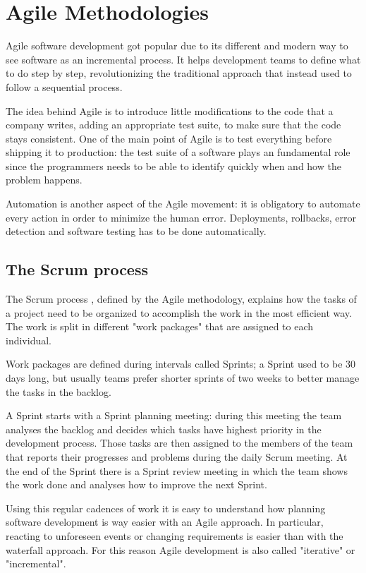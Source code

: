 \section{Agile Methodologies}

Agile software development \cite{AgileSoftwareManifesto} got popular due
to its different and modern way to see software as an incremental process.
It helps development teams to define what to do step by step,
revolutionizing the traditional approach that instead used to follow
a sequential process.

The idea behind Agile is to introduce little modifications to the code
that a company writes, adding an appropriate test suite, to make sure that
the code stays consistent. One of the main point of Agile is to test
everything before shipping it to production: the test suite of a software
plays an fundamental role since the programmers needs to be able to
identify quickly when and how the problem happens.

Automation is another aspect of the Agile movement: it is obligatory to
automate every action in order to minimize the human error. Deployments,
rollbacks, error detection and software testing has to be done
automatically.

\subsection{The Scrum process}

The Scrum process \cite{ScrumManifesto}, defined by the Agile methodology,
explains how the tasks of a project need to be organized to accomplish the
work in the most efficient way. The work is split in different "work
packages" that are assigned to each individual.

Work packages are defined during intervals called Sprints; a Sprint used
to be 30 days long, but usually teams prefer shorter sprints of two weeks
to better manage the tasks in the backlog.

A Sprint starts with a Sprint planning meeting: during this meeting the team
analyses the backlog and decides which tasks have highest priority in the
development process. Those tasks are then assigned to the members of the
team that reports their progresses and problems during the daily Scrum
meeting. At the end of the Sprint there is a Sprint review meeting in
which the team shows the work done and analyses how to improve the next
Sprint.

Using this regular cadences of work it is easy to understand how planning
software development is way easier with an Agile approach. In particular,
reacting to unforeseen events or changing requirements is easier than with
the waterfall approach. For this reason Agile development is also called
"iterative" or "incremental".

